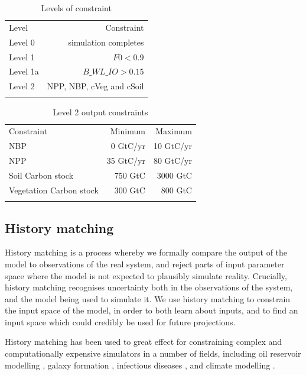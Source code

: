 \documentclass[gmd, manuscript]{copernicus}
\begin{document}
\begin{table}[t]
\caption{Levels of constraint}
\label{table:levels_of_constraint}
\begin{tabular}{l r}
\tophline
Level & Constraint  \\ 
\middlehline
Level 0  & simulation completes \\
Level 1 & $F0 < 0.9$ \\
Level 1a & $B\_WL\_IO > 0.15 $ \\ 
Level 2  & NPP, NBP, cVeg and cSoil \\

\bottomhline
\end{tabular}
\belowtable{} %

\end{table}


\begin{table}[t]
\caption{Level 2 output constraints}
\label{table:level_2_constraints}
\begin{tabular}{l r r}
\tophline
Constraint & Minimum & Maximum \\ 
\middlehline
NBP & 0 GtC/yr &  10 GtC/yr\\
NPP & 35 GtC/yr & 80 GtC/yr \\
Soil Carbon stock & 750 GtC &  3000 GtC\\ 
Vegetation Carbon stock & 300 GtC & 800 GtC \\

\bottomhline
\end{tabular}
\belowtable{} %

\end{table}


\subsection{History matching}\label{ssec:history_matching}

History matching is a process whereby we formally compare the output of the model to observations of the real system, and reject parts of input parameter space where the model is not expected to plausibly simulate reality. Crucially, history matching recognises uncertainty both in the observations of the system, and the model being used to simulate it. We use history matching to constrain the input space of the model, in order to both learn about inputs, and to find an input space which could credibly be used for future projections.

History matching has been used to great effect for constraining complex and computationally expensive simulators in a number of fields, including oil reservoir modelling \citep{craig1996strategies, craig1997pressure}, galaxy formation \citep{vernon2010galaxy, vernon2014observable}, infectious diseases \citep{andrianakis2015bayesian}, and climate modelling \citep{williamson2013history, williamson2015identifying, mcneall2020correcting}.
\end{document}
